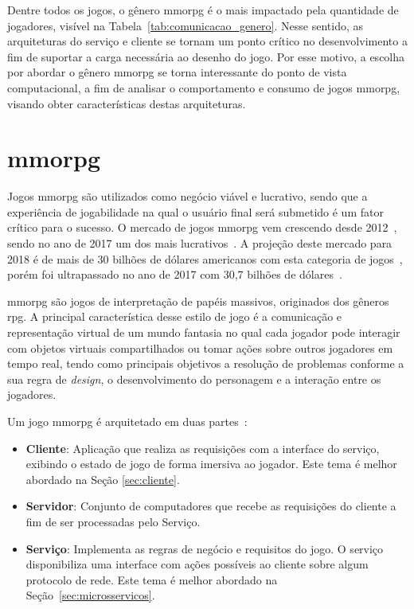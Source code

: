 Dentre todos os jogos, o gênero \ac{mmorpg} é o mais impactado pela quantidade de jogadores\cite{mmo_analytic}, visível na Tabela~\ref{tab:comunicacao_genero}.
%
Nesse sentido, as arquiteturas do serviço e cliente se tornam um ponto crítico no desenvolvimento a fim de suportar a carga necessária ao desenho do jogo.
%
Por esse motivo, a escolha por abordar o gênero \ac{mmorpg} se torna interessante do ponto de vista computacional, a fim de analisar o comportamento e consumo de jogos \ac{mmorpg}, visando obter características destas arquiteturas.



\section{\ac{mmorpg}}
\label{sec:mmorpg}



Jogos \ac{mmorpg} são utilizados como negócio viável e lucrativo, sendo que a experiência de jogabilidade na qual o usuário final será submetido é um fator crítico para o sucesso.
%
O mercado de jogos \ac{mmorpg} vem crescendo desde 2012~\cite{new_york_times}, sendo no ano de 2017 um dos mais lucrativos~\cite{statista_2018_mmo}.
%
A projeção deste mercado para 2018 é de mais de 30 bilhões de dólares americanos com esta categoria de jogos~\cite{statista_2018}, porém foi ultrapassado no ano de 2017 com 30,7 bilhões de dólares~\cite{statista_2018_mmo}.



\ac{mmorpg} são jogos de interpretação de papéis massivos, originados dos gêneros \ac{rpg}.
%
A principal característica desse estilo de jogo é a comunicação e representação virtual de um mundo fantasia no qual cada jogador pode interagir com objetos virtuais compartilhados ou tomar ações sobre outros jogadores em tempo real, tendo como principais objetivos a resolução de problemas conforme a sua regra de \textit{design}, o desenvolvimento do personagem e a interação entre os jogadores\cite{video_game_technologies}.



Um jogo \ac{mmorpg} é arquitetado em duas partes~\cite{mmo_analytic}:
\begin{itemize}
  \item \textbf{Cliente}: Aplicação que realiza as requisições com a interface do serviço, exibindo o estado de jogo de forma imersiva ao jogador. Este tema é melhor abordado na Seção \ref{sec:cliente}.
  \item \textbf{Servidor}: Conjunto de computadores que recebe as requisições do cliente a fim de ser processadas pelo Serviço.
  \item \textbf{Serviço}: Implementa as regras de negócio e requisitos do jogo. O serviço disponibiliza uma interface com ações possíveis ao cliente sobre algum protocolo de rede. Este tema é melhor abordado na Seção~\ref{sec:microsservicos}.
\end{itemize}

